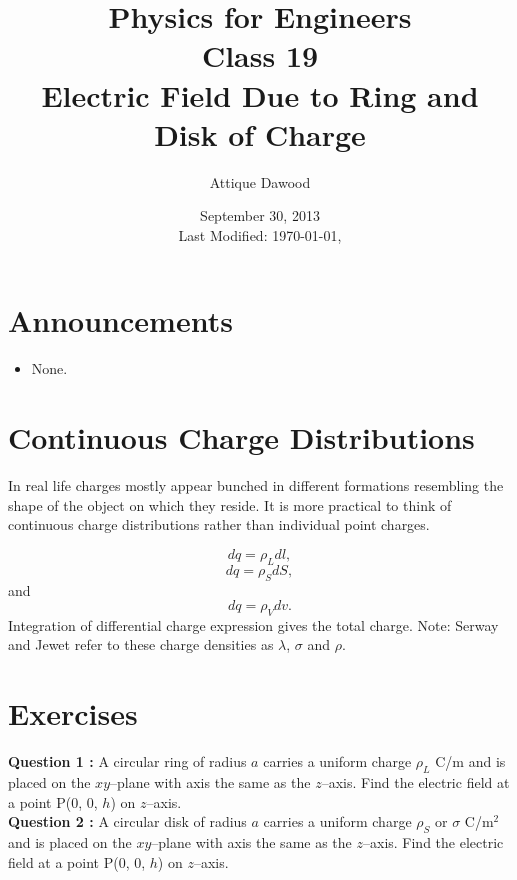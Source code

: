 \documentclass[12pt,a4paper]{article}
\title{\vspace{-2cm}Physics for Engineers\\Class 19\\Electric Field Due to Ring and Disk of Charge}
\author{Attique Dawood}
\date{September 30, 2013\\[0.2cm] Last Modified: \today, \currenttime}
\begin{document}
\maketitle
\section{Announcements}
\begin{itemize}
\item None.
\end{itemize}
\section{Continuous Charge Distributions}
In real life charges mostly appear bunched in different formations resembling the shape of the object on which they reside. It is more practical to think of continuous charge distributions rather than individual point charges.

\begin{equation}
dq=\rho_Ldl,
\end{equation}
\begin{equation}
dq=\rho_SdS,
\end{equation}
and
\begin{equation}
dq=\rho_Vdv.
\end{equation}
Integration of differential charge expression gives the total charge.
Note: Serway and Jewet \cite{Serway} refer to these charge densities as $\lambda$, $\sigma$ and $\rho$.
\section{Exercises}
\noindent\textbf{Question 1 \cite[Example 4.4, page 117]{Sadiku}\cite[Example 23.8, page 721]{Serway}:} A circular ring of radius $a$ carries a uniform charge $\rho_L$ C/m and is placed on the $xy$--plane with axis the same as the $z$--axis. Find the electric field at a point P(0, 0, $h$) on $z$--axis.\\[0.2cm]
\noindent\textbf{Question 2 \cite[Practice Exercise 4.4, page 119]{Sadiku}\cite[Example 23.9, page 722]{Serway}:} A circular disk of radius $a$ carries a uniform charge $\rho_S$ or $\sigma$ C/m$^2$ and is placed on the $xy$--plane with axis the same as the $z$--axis. Find the electric field at a point P(0, 0, $h$) on $z$--axis.


\end{document}
